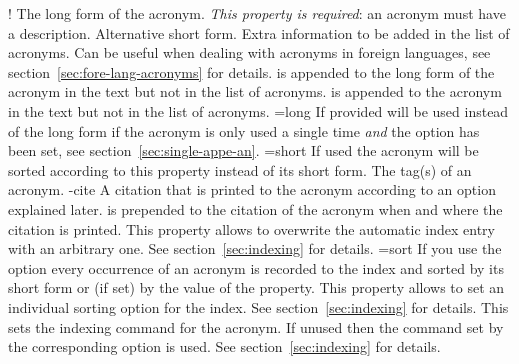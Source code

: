\documentclass{acro-manual}
\begin{document}
\begin{properties}
  \Initial!
    The long form of the acronym.  \emph{This property is required}: an
    acronym must have a description.
  \Initial
    Alternative short form.
  \Initial
    Extra information to be added in the list of acronyms.
  \Initial
    Can be useful when dealing with acronyms in foreign languages, see
    section~\vref{sec:fore-lang-acronyms} for details.
  \Initial
     is appended to the long form of the acronym in the text but
    not in the list of acronyms.
  \Initial
     is appended to the acronym in the text but not in the list of
    acronyms.
  \Initial={long}
    If provided  will be used instead of the long form if the
    acronym is only used a single time \emph{and} the option
     has been set, see section~\vref{sec:single-appe-an}.
  \Initial={short}
    If used the acronym will be sorted according to this property instead of
    its short form.
  \Initial
    The tag(s) of an acronym.
  \proplit-{cite}{}\Initial
    A citation that is printed to the acronym according to an option explained
    later.
  \Initial
     is prepended to the citation of the acronym when and where
    the citation is printed.
  \Initial
    This property allows to overwrite the automatic index entry with an
    arbitrary one.  See section~\vref{sec:indexing} for details.
  \Initial={sort}
    If you use the option  every occurrence of an acronym is
    recorded to the index and sorted by its short form or (if set) by the
    value of the  property.  This property allows to set an
    individual sorting option for the index.  See section~\vref{sec:indexing}
    for details.
  \Initial
    This sets the indexing command for the acronym.  If unused then the
    command set by the corresponding option is used.  See
    section~\vref{sec:indexing} for details.
\end{properties}
\end{document}
